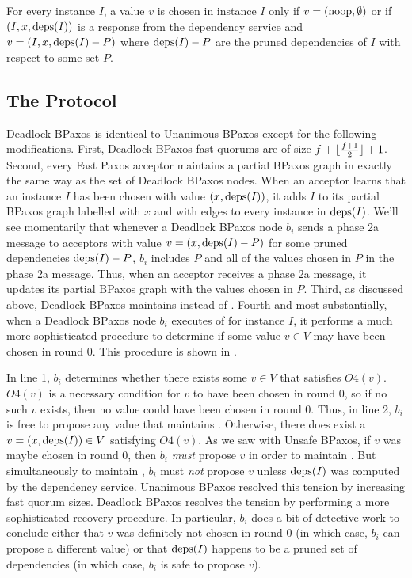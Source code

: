 \begin{invariant}
  For every instance $I$, a value $v$ is chosen in instance $I$ only if $v =
  (\text{noop}, \emptyset)$ or if $(I, x, \text{deps}(I))$ is a response from the
  dependency service and $v = (I, x, \text{deps}(I) - P)$ where $\text{deps}(I) - P$ are
  the pruned dependencies of $I$ with respect to some set $P$.
\end{invariant}

\subsection{The Protocol}
Deadlock BPaxos is identical to Unanimous BPaxos except for the
following modifications.
%
First, Deadlock BPaxos fast quorums are of size $f + \lfloor\frac{f + 1}{2}\rfloor + 1$.
%
Second, every Fast Paxos acceptor maintains a partial BPaxos graph in exactly
the same way as the set of Deadlock BPaxos nodes. When an acceptor learns that
an instance $I$ has been chosen with value $(x, \text{deps}(I))$, it adds $I$ to its
partial BPaxos graph labelled with $x$ and with edges to every instance in
$\text{deps}(I)$.  We'll see momentarily that whenever a Deadlock BPaxos node $b_i$
sends a phase 2a message to acceptors with value $v = (x, \text{deps}(I) - P)$ for
some pruned dependencies $\text{deps}(I) - P$, $b_i$ includes $P$ and all of the
values chosen in $P$ in the phase 2a message. Thus, when an acceptor receives a
phase 2a message, it updates its partial BPaxos graph with the values chosen in
$P$.
%
Third, as discussed above, Deadlock BPaxos maintains
 instead of .
%
Fourth and most substantially, when a Deadlock BPaxos node $b_i$ executes
 of  for instance $I$, it
performs a much more sophisticated procedure to determine if some value $v \in
V$ may have been chosen in round $0$. This procedure is shown in
.



In line 1, $b_i$ determines whether there exists some $v \in V$ that satisfies
$O4(v)$. $O4(v)$ is a necessary condition for $v$ to have been chosen in round
$0$, so if no such $v$ exists, then no value could have been chosen in round
$0$. Thus, in line 2, $b_i$ is free to propose any value that maintains
.
%
Otherwise, there does exist a $v = (x, \text{deps}(I)) \in V$ satisfying $O4(v)$. As
we saw with Unsafe BPaxos, if $v$ was maybe chosen in round $0$, then $b_i$
\emph{must} propose $v$ in order to maintain . But
simultaneously to maintain , $b_i$ must \emph{not}
propose $v$ unless $\text{deps}(I)$ was computed by the dependency service. Unanimous
BPaxos resolved this tension by increasing fast quorum sizes. Deadlock BPaxos
resolves the tension by performing a more sophisticated recovery procedure.  In
particular, $b_i$ does a bit of detective work to conclude either that $v$ was
definitely not chosen in round $0$ (in which case, $b_i$ can propose a
different value) or that $\text{deps}(I)$ happens to be a pruned set of dependencies
(in which case, $b_i$ is safe to propose $v$).

